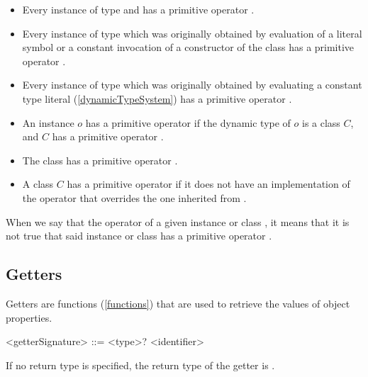 \documentclass[makeidx]{article}
\begin{document}
\begin{itemize}
\item Every instance of type  and 
  has a primitive operator \lit{==}.
\item Every instance of type 
  which was originally obtained by evaluation of a literal symbol or
  a constant invocation of a constructor of the  class
  has a primitive operator \lit{==}.
\item Every instance of type 
  which was originally obtained by evaluating a constant type literal
  (\ref{dynamicTypeSystem})
  has a primitive operator \lit{==}.
\item An instance $o$ has a primitive operator \lit{==}
  if the dynamic type of $o$ is a class $C$,
  and $C$ has a primitive operator \lit{==}.
\item The class  has a primitive operator \lit{==}.
\item A class $C$ has a primitive operator \lit{==}
  if it does not have an implementation of the operator \lit{==}
  that overrides the one inherited from .
\end{itemize}

\LMHash{}%
When we say that the operator \lit{==} of a given instance or class
,
it means that it is not true that said instance or class
has a primitive operator \lit{==}.


\subsection{Getters}

\LMHash{}%
Getters are functions (\ref{functions}) that are used to retrieve the values of object properties.

\begin{grammar}
<getterSignature> ::= <type>? \GET{} <identifier>
\end{grammar}

\LMHash{}%
If no return type is specified, the return type of the getter is \DYNAMIC{}.
\end{document}
